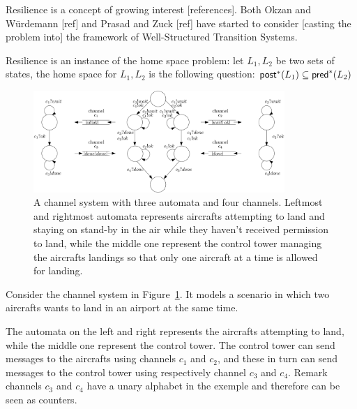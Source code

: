 Resilience is a concept of growing interest [references]. Both Okzan and Würdemann [ref] and Prasad and Zuck [ref] have started to consider [casting the problem into] the framework of Well-Structured Transition Systems. 
 
Resilience is an instance of the home space problem: let $L_1,L_2$ be two sets of states, the home space for  $L_1,L_2$ is the following question:		
	$\textsf{post}^*(L_1)	\subseteq \textsf{pred}^*(L_2)$


\begin{center}
	\begin{figure}
			\hspace{0.75cm}
\includegraphics[width=0.85\textwidth]{FigureB}
	\caption{A channel system with three automata and four channels. Leftmost and rightmost automata represents aircrafts attempting to land and staying on stand-by in the air while they haven't received permission to land, while the middle one represent the control tower managing the aircrafts landings so that only one aircraft at a time is allowed for landing.}
					\label{air control}
	\end{figure}
\end{center}

Consider the channel system in Figure~\ref{air control}. It models a scenario in which two aircrafts wants to land in an airport at the same time. 

The automata on the left and right represents the aircrafts attempting to land, while the middle one represent the control tower. The control tower can send messages to the aircrafts using channels $c_1$ and $c_2$, and these in turn can send messages to the control tower using respectively channel $c_3$ and $c_4$. Remark channels $c_3$ and $c_4$ have a unary alphabet
in the exemple and therefore can be seen as counters. 

